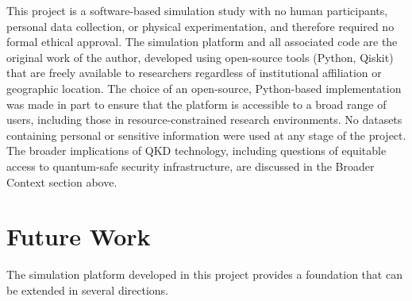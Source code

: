 \documentclass[10pt, a4paper]{report}
\begin{document}
This project is a software-based simulation study with no human participants, personal data collection, or physical experimentation, and therefore required no formal ethical approval. The simulation platform and all associated code are the original work of the author, developed using open-source tools (Python, Qiskit) that are freely available to researchers regardless of institutional affiliation or geographic location. The choice of an open-source, Python-based implementation was made in part to ensure that the platform is accessible to a broad range of users, including those in resource-constrained research environments. No datasets containing personal or sensitive information were used at any stage of the project. The broader implications of QKD technology, including questions of equitable access to quantum-safe security infrastructure, are discussed in the Broader Context section above.


\section{Future Work}

The simulation platform developed in this project provides a foundation that can be extended in several directions.
\end{document}
